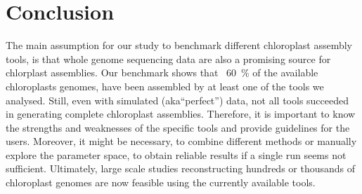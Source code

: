 \documentclass{bmcart}
\newcounter{todocounter}
\newcommand{\ff}[1]
{\stepcounter{todocounter}
 \todo[color=blue!40,author=For Frank]{\thetodocounter: #1}
 }
\begin{document}
\section*{Conclusion}
The main assumption for our study to benchmark different chloroplast assembly tools, is that whole genome sequencing data are also a promising source for chlorplast assemblies.
Our benchmark shows that ~\SI{60}{\percent} of the available chloroplasts genomes, have been assembled by at least one of the tools we analysed.
Still, even with simulated (aka``perfect'') data, not all tools succeeded in generating complete chloroplast assemblies.
Therefore, it is important to know the strengths and weaknesses of the specific tools and provide guidelines for the users.
Moreover, it might be necessary, to combine different methods or manually explore the parameter space, to obtain reliable results if a single run seems not sufficient.
Ultimately, large scale studies reconstructing hundreds or thousands of chloroplast genomes are now feasible using the currently available tools. 

\end{document}
